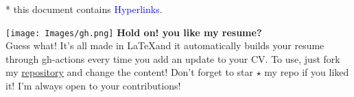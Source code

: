 \documentclass[11pt, a4paper, sans]{moderncv}
\begin{document}
    \pagestyle{empty}
    
    { * this document contains \textcolor{blue}{Hyperlinks}.\vspace{2mm}}
    
    \hspace{8mm}
    \newline
    \texttt{[image: Images/gh.png]}
    \Large{\textbf{Hold on! you like my resume?} \\
    Guess what! It's all made in \LaTeX  and it automatically builds your resume through gh-actions every time you add an update to your CV. To use, just fork my \href{https://github.com/Ehsan2754/Resume.git}{\color{blue}repository} and change the content! Don't forget to star $\star$ my repo if you liked it! I'm always open to your contributions! }
\end{document}
